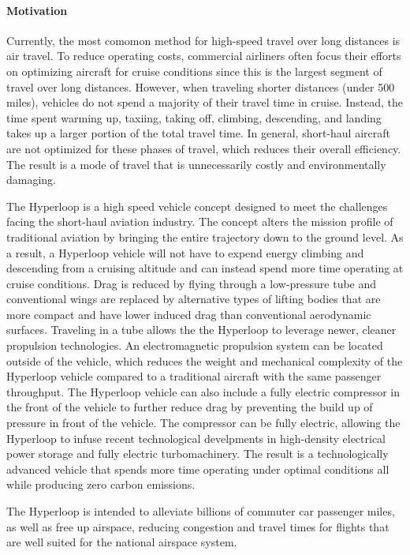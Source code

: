 \paragraph{Motivation}

	Currently, the most comomon method for high-speed travel over long distances is air travel.
	To reduce operating costs, commercial airliners often focus their efforts on optimizing aircraft for
	cruise conditions since this is the largest segment of travel over long distances.
	However, when traveling shorter distances (under 500 miles), vehicles do not spend a majority of their travel time in cruise.
	Instead, the time spent warming up, taxiing, taking off, climbing, descending, and landing
	takes up a larger portion of the total travel time. In general, short-haul aircraft are not optimized
	for these phases of travel, which reduces their overall efficiency. The result is a mode of travel that is
	unnecessarily costly and environmentally damaging.

	The Hyperloop is a high speed vehicle concept designed to meet the challenges facing the short-haul aviation industry.
	The concept alters the mission profile of traditional aviation by bringing the entire trajectory down to the ground level.
	As a result, a Hyperloop vehicle will not have to expend energy climbing and descending from
	a cruising altitude and can instead spend more time operating at cruise conditions.
	Drag is reduced by flying through a low-pressure tube
	and conventional wings are replaced by alternative types of lifting bodies
	that are more compact and have lower induced drag than conventional aerodynamic surfaces.
	Traveling in a tube allows the the Hyperloop to leverage newer, cleaner propulsion technologies.
	An electromagnetic propulsion system can be located outside of the vehicle,
	which reduces the weight and mechanical complexity of the Hyperloop vehicle compared to a
	traditional aircraft with the same passenger throughput.
	The Hyperloop vehicle can also include a fully electric compressor in the front of the vehicle to
	further reduce drag by preventing the build up of pressure in front of the vehicle.
	The compressor can be fully electric, allowing the Hyperloop to infuse recent technological develpments in
	high-density electrical power storage and fully electric turbomachinery.
	The result is a technologically advanced vehicle that spends more time operating under optimal conditions
	all while producing zero carbon emissions.

	The Hyperloop is intended to alleviate billions of commuter car passenger miles,
	as well as free up airspace, reducing congestion and travel times for
	flights that are well suited for the national airspace system.

